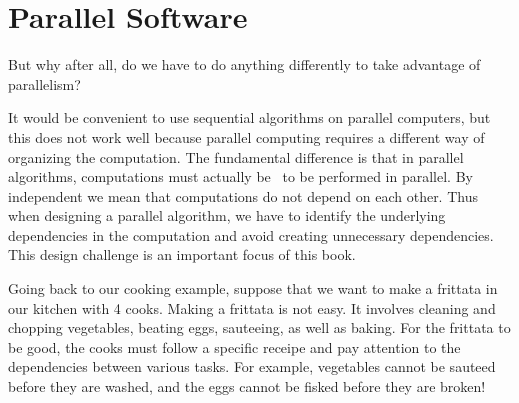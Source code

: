 \section{Parallel Software}

\begin{teachask}
But why after all, do we have to do anything differently to take
advantage of parallelism?  
\end{teachask}

\begin{gram}
\label{gr:intro::intro::parallelism::challenges}
It would be convenient to use sequential algorithms on parallel
computers, but this does not work well because parallel computing
requires a different way of organizing the computation.
%
The fundamental difference is that in parallel algorithms,
computations must actually be~ to be performed in
parallel.
%
By independent we mean that computations do not depend on each other.
%
Thus when designing a parallel algorithm, we have to identify the
underlying dependencies in the computation and avoid creating
unnecessary dependencies.
%
This design challenge is an important focus of this book.
\end{gram}


\begin{example}
Going back to our cooking example, suppose that we want to make a
frittata in our kitchen with 4 cooks.
%
Making a frittata is not easy.
%
It involves cleaning and chopping vegetables, beating eggs,
sauteeing, as well as baking.
%
For the frittata to be good, the cooks must follow a specific receipe
and pay attention to the dependencies between various tasks.
%
For example,
%
vegetables cannot be sauteed before they are washed, and 
%
the eggs cannot be fisked before they are broken!
%
\end{example}

